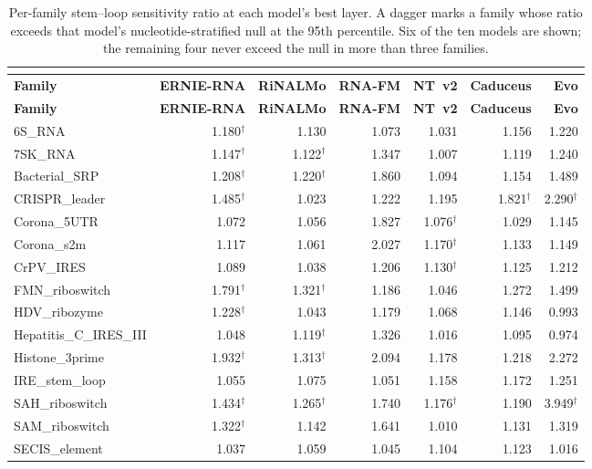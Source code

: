 \documentclass[11pt]{article}
\begin{document}
\begin{longtable}{@{}lrrrrrr@{}}
\caption{Per-family stem--loop sensitivity ratio at each model's best layer. A dagger marks a family whose ratio exceeds that model's nucleotide-stratified null at the 95th percentile. Six of the ten models are shown; the remaining four never exceed the null in more than three families.}\\
\label{tab:s2}\\
\toprule
\textbf{Family} & \textbf{ERNIE-RNA} & \textbf{RiNALMo} & \textbf{RNA-FM} & \textbf{NT~v2} & \textbf{Caduceus} & \textbf{Evo} \\
\midrule
\endfirsthead
\toprule
\textbf{Family} & \textbf{ERNIE-RNA} & \textbf{RiNALMo} & \textbf{RNA-FM} & \textbf{NT~v2} & \textbf{Caduceus} & \textbf{Evo} \\
\midrule
\endhead
6S\_RNA & 1.180$^\dagger$ & 1.130 & 1.073 & 1.031 & 1.156 & 1.220 \\
7SK\_RNA & 1.147$^\dagger$ & 1.122$^\dagger$ & 1.347 & 1.007 & 1.119 & 1.240 \\
Bacterial\_SRP & 1.208$^\dagger$ & 1.220$^\dagger$ & 1.860 & 1.094 & 1.154 & 1.489 \\
CRISPR\_leader & 1.485$^\dagger$ & 1.023 & 1.222 & 1.195 & 1.821$^\dagger$ & 2.290$^\dagger$ \\
Corona\_5UTR & 1.072 & 1.056 & 1.827 & 1.076$^\dagger$ & 1.029 & 1.145 \\
Corona\_s2m & 1.117 & 1.061 & 2.027 & 1.170$^\dagger$ & 1.133 & 1.149 \\
CrPV\_IRES & 1.089 & 1.038 & 1.206 & 1.130$^\dagger$ & 1.125 & 1.212 \\
FMN\_riboswitch & 1.791$^\dagger$ & 1.321$^\dagger$ & 1.186 & 1.046 & 1.272 & 1.499 \\
HDV\_ribozyme & 1.228$^\dagger$ & 1.043 & 1.179 & 1.068 & 1.146 & 0.993 \\
Hepatitis\_C\_IRES\_III & 1.048 & 1.119$^\dagger$ & 1.326 & 1.016 & 1.095 & 0.974 \\
Histone\_3prime & 1.932$^\dagger$ & 1.313$^\dagger$ & 2.094 & 1.178 & 1.218 & 2.272 \\
IRE\_stem\_loop & 1.055 & 1.075 & 1.051 & 1.158 & 1.172 & 1.251 \\
SAH\_riboswitch & 1.434$^\dagger$ & 1.265$^\dagger$ & 1.740 & 1.176$^\dagger$ & 1.190 & 3.949$^\dagger$ \\
SAM\_riboswitch & 1.322$^\dagger$ & 1.142 & 1.641 & 1.010 & 1.131 & 1.319 \\
SECIS\_element & 1.037 & 1.059 & 1.045 & 1.104 & 1.123 & 1.016 \\

\end{longtable}
\end{document}
